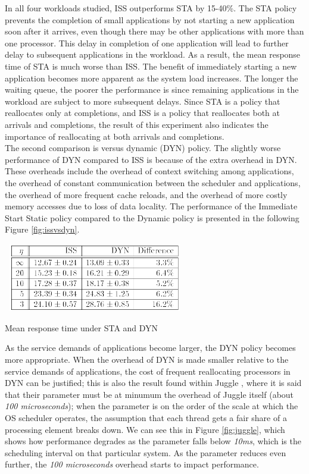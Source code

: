 \documentclass[a4paper,10pt]{article}
\makeatletter
\newenvironment{figurehere}{\def\@captype{figure}\vspace{2ex}}{\vspace{2ex}}
\makeatother
\begin{document}
\begin{multicols}{2}
In all four workloads studied, ISS outperforms STA by  15-40\%. The STA policy prevents the completion of small applications by not starting a new application soon after it arrives, even though there may be other applications with more than one processor. This delay in completion of one application will lead to further delay to subsequent applications in the workload. As a result, the mean response time of STA is much worse than ISS. The benefit of immediately starting a new application becomes more apparent as the system load increases. The longer the waiting queue, the poorer the performance is since remaining applications in the workload are subject to more subsequent delays. Since STA is a policy that reallocates only at completions, and ISS is a policy that reallocates both at arrivals and completions, the result of this experiment also indicates the importance of reallocating at both arrivals and completions.\\

The second comparison is versus dynamic (DYN) policy. The slightly worse performance of DYN compared to ISS is because of the extra overhead in DYN. These overheads include the overhead of context switching among applications, the overhead of constant communication between the scheduler and applications, the overhead of more frequent cache reloads, and the overhead of more costly memory accesses due to loss of data locality. The performance of the Immediate Start Static policy compared to the Dynamic policy is presented in the following Figure \ref{fig:issvsdyn}.

\begin{figurehere}
 \centering
 \includegraphics[width=8cm, height=3cm]{./eps/issvsdyn.png}
 \caption{Mean response time under STA and DYN}
 \label{fig:issvsdyn}
\end{figurehere}

As the service demands of applications become larger, the DYN policy becomes more appropriate. When the overhead of DYN is made smaller relative to the service demands of applications, the cost of frequent reallocating processors in DYN can be justified; this is also the result found within Juggle \cite{juggle}, where it is said that their parameter must be at minumum the overhead of Juggle itself (about \emph{100 microseconds}); when the parameter is on the order of the scale at which the OS scheduler operates, the assumption that each thread gets a fair share of a processing element breaks down. We can see this in Figure \ref{fig:juggle}, which shows how performance degrades as the parameter falls below \emph{10ms}, which is the scheduling interval on that particular system. As the parameter reduces even further, the \emph{100 microseconds} overhead starts to impact performance.


\end{multicols}
\end{document}
